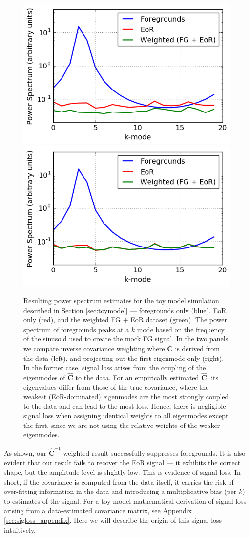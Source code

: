 \documentclass[preprint2,numberedappendix,tighten]{aastex6}  %
\begin{document}
\begin{figure}
	\centering
	\includegraphics[trim={0cm 0cm 0cm 0cm},clip,height=0.33\textwidth]{plots/toy_sigloss3.png}
	\includegraphics[trim={0cm 0cm 0cm 0cm},clip,height=0.33\textwidth]{plots/toy_sigloss4.png}
	\caption{Resulting power spectrum estimates for the toy model simulation described in Section \ref{sec:toymodel} --- 
foregrounds only (blue), EoR only (red), and the weighted FG + EoR dataset (green). The power spectrum of foregrounds peaks at a $k$ mode based on the frequency of the sinusoid used to create the mock FG signal. In the two panels, we compare inverse covariance weighting 
where $\textbf{C}$ is derived from the data (left), and projecting out the first eigenmode only (right). In the former 
case, signal loss arises from the coupling of the eigenmodes of $\widehat{\textbf{C}}$ to the data. For an empirically estimated $\widehat{\textbf{C}}$, its eigenvalues differ from those of the true covariance, where the weakest (EoR-dominated) eigenmodes are the most strongly coupled to the data and can lead to the most loss.
Hence, there is negligible signal loss when assigning identical weights to all eigenmodes except the first, since we are not using the relative weights of the weaker eigenmodes.}
	\label{fig:toy_sigloss3}
\end{figure}

As shown, our $\widehat{\textbf{C}}^{-1}$ weighted result successfully suppresses foregrounds. It is also evident that our result fails to 
recover the EoR signal --- it exhibits the correct shape, but the amplitude level is slightly low. This is evidence of signal loss. In short, if the covariance is computed from the data itself, it carries the risk of over-fitting information in the data and introducing a 
multiplicative bias (per $k$) to estimates of the signal. For a toy model mathematical derivation of signal loss arising from a data-estimated covariance matrix, see Appendix \ref{sec:sigloss_appendix}. Here we will describe the origin of this signal loss 
intuitively.
\end{document}
